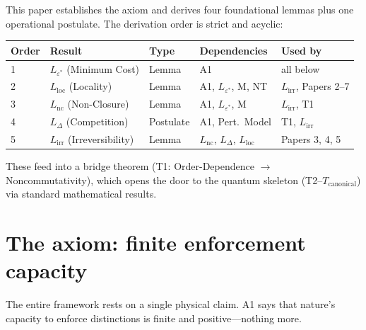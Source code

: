 \documentclass[11pt]{article}
\begin{document}
This paper establishes the axiom and derives four foundational lemmas plus one operational postulate.  The derivation order is strict and acyclic:

\begin{center}
\begin{tabular}{lllll}
\toprule
\textbf{Order} & \textbf{Result} & \textbf{Type} & \textbf{Dependencies} & \textbf{Used by} \\
\midrule
1 & $L_{\varepsilon^*}$ (Minimum Cost) & Lemma & A1 & all below \\
2 & $L_{\mathrm{loc}}$ (Locality) & Lemma & A1, $L_{\varepsilon^*}$, M, NT & $L_{\mathrm{irr}}$, Papers 2--7 \\
3 & $L_{\mathrm{nc}}$ (Non-Closure) & Lemma & A1, $L_{\varepsilon^*}$, M & $L_{\mathrm{irr}}$, T1 \\
4 & $L_{\Delta}$ (Competition) & Postulate & A1, Pert.\ Model & T1, $L_{\mathrm{irr}}$ \\
5 & $L_{\mathrm{irr}}$ (Irreversibility) & Lemma & $L_{\mathrm{nc}}$, $L_\Delta$, $L_{\mathrm{loc}}$ & Papers 3, 4, 5 \\
\bottomrule
\end{tabular}
\end{center}

These feed into a bridge theorem (T1: Order-Dependence $\to$ Noncommutativity), which opens the door to the quantum skeleton (T2--$T_{\mathrm{canonical}}$) via standard mathematical results.

\section{The axiom: finite enforcement capacity}

The entire framework rests on a single physical claim.  A1 says that nature's capacity to enforce distinctions is finite and positive---nothing more.
\end{document}
